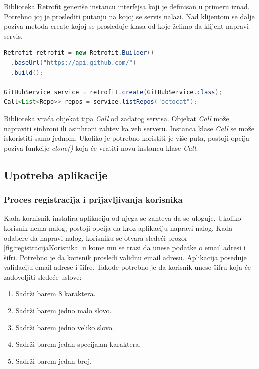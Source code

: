 \documentclass[12pt,oneside]{memoir}
\begin{document}
Biblioteka Retrofit generiše instancu interfejsa koji je definisan u primeru iznad. Potrebno joj je proslediti putanju na kojoj se servis nalazi. Nad klijentom se dalje poziva metoda create kojoj se prosleđuje klasa od koje želimo da klijent napravi servis.
\begin{lstlisting}[caption={Inicijalizacija Retrofit klijenta i primer korišćenja},captionpos=t, language=Java]
Retrofit retrofit = new Retrofit.Builder()
  .baseUrl("https://api.github.com/")
  .build();

GitHubService service = retrofit.create(GitHubService.class);
Call<List<Repo>> repos = service.listRepos("octocat");
\end{lstlisting}


Biblioteka vraća objekat tipa \emph{Call} od zadatog servisa. Objekat \emph{Call} može napraviti sinhroni ili asinhroni zahtev ka veb serveru. Instanca klase \emph{Call} se može iskoristiti samo jednom. Ukoliko je potrebno koristiti je više puta, postoji opcija poziva funkcije \emph{clone()} koja će vratiti novu instancu klase \emph{Call}.
 
\subsection{Upotreba aplikacije}
 
\subsubsection{Proces registracija i prijavljivanja korisnika}
 
Kada kornisnik instalira aplikaciju od njega se zahteva da se uloguje. Ukoliko korisnik nema nalog, postoji opcija da kroz aplikaciju napravi nalog. Kada odabere da napravi nalog, korisniku se otvara sledeći prozor \ref{fig:registracijaKorisnika} u kome mu se trazi da unese podatke o email adresi i šifri. Potrebno je da korisnik prosledi validnu email adresu. Aplikacija poseduje validaciju email adrese i šifre. Takođe potrebno je da korisnik unese šifru koja će zadovoljiti sledeće uslove:

\begin{enumerate}
  \item Sadrži barem 8 karaktera.
  \item Sadrži barem jedno malo slovo.
  \item Sadrži barem jedno veliko slovo.
  \item Sadrži barem jedan specijalan karaktera.
  \item Sadrži barem jedan broj.
\end{enumerate}
 
\end{document}
